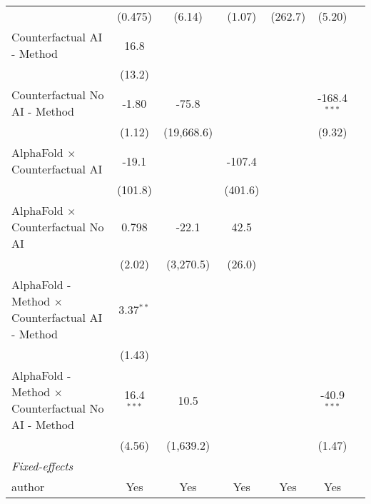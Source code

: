 \begin{tabular}{lcccccc}
                                                              & (0.475)      & (6.14)     & (1.07)      & (262.7) & (5.20)         &   \\   
   Counterfactual AI - Method                                 & 16.8         &            &             &         &                &   \\   
                                                              & (13.2)       &            &             &         &                &   \\   
   Counterfactual No AI - Method                              & -1.80        & -75.8      &             &         & -168.4$^{***}$ &   \\   
                                                              & (1.12)       & (19,668.6) &             &         & (9.32)         &   \\   
   AlphaFold $\times$ Counterfactual AI                       & -19.1        &            & -107.4      &         &                &   \\   
                                                              & (101.8)      &            & (401.6)     &         &                &   \\   
   AlphaFold $\times$ Counterfactual No AI                    & 0.798        & -22.1      & 42.5        &         &                &   \\   
                                                              & (2.02)       & (3,270.5)  & (26.0)      &         &                &   \\   
   AlphaFold - Method $\times$ Counterfactual AI - Method     & 3.37$^{**}$  &            &             &         &                &   \\   
                                                              & (1.43)       &            &             &         &                &   \\   
   AlphaFold - Method $\times$ Counterfactual No AI - Method  & 16.4$^{***}$ & 10.5       &             &         & -40.9$^{***}$  &   \\   
                                                              & (4.56)       & (1,639.2)  &             &         & (1.47)         &   \\   
   \midrule
   \emph{Fixed-effects}\\
   author                                                     & Yes          & Yes        & Yes         & Yes     & Yes            & \\  

\end{tabular}

